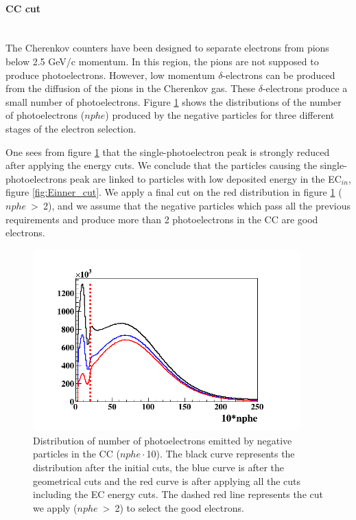 \begin{itemize}
\begin{itemize}
\end{itemize}

\paragraph{CC cut} ~\\
The Cherenkov counters have been designed to separate electrons from pions below 2.5 GeV/c momentum. In this region, the pions are not supposed to produce photoelectrons. However, low momentum $\delta$-electrons can be produced from the diffusion of the pions in the Cherenkov gas. These $\delta$-electrons produce a small number of photoelectrons. Figure \ref{fig:Nphe_cut} shows the distributions of the number of photoelectrons ($nphe$) produced by the negative particles for three different stages of the electron selection.

   
One sees from figure \ref{fig:Nphe_cut} that the single-photoelectron peak is 
strongly reduced after applying the energy cuts. We conclude that the particles 
causing the single-photoelectrons peak are linked to particles with low 
deposited energy in the EC$_{in}$, figure \ref{fig:Einner_cut}. We apply a 
final cut on the red distribution in figure \ref{fig:Nphe_cut} ($nphe$~>~2), 
and we assume that the negative particles which pass all the previous 
requirements and produce more than 2 photoelectrons in the CC are good 
electrons.
\begin{figure}[tpb]
\centering
\includegraphics[height=7.0cm]{fig_analysis/nphe_all.png}
\caption{Distribution of number of photoelectrons emitted by negative particles 
in the CC ($nphe\cdot$10). The black curve represents the distribution after 
the initial cuts, the blue curve is after the geometrical cuts and the red 
curve is after applying all the cuts including the EC energy cuts. The dashed 
red line represents the cut we apply ($nphe$~>~2) to select the good 
electrons.} \label{fig:Nphe_cut}
\end{figure}


\end{itemize}

